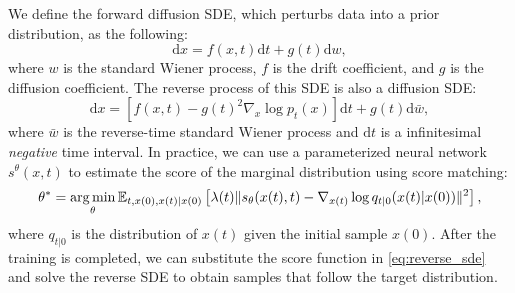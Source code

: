 We define the forward diffusion SDE, which perturbs data into a prior distribution, as the following:
\begin{equation}\label{eq:forward_sde}
    \mathrm d x = f(x, t)\mathrm d t + g(t)\mathrm dw,
\end{equation}
where $w$ is the standard Wiener process, $f$ is the drift coefficient, and $g$ is the diffusion coefficient. The reverse process of this SDE is also a diffusion SDE:
\begin{equation}\label{eq:reverse_sde}
    \mathrm d x = \left[f(x,t)-g(t)^2 \nabla_x \log p_t(x)\right]\mathrm dt + g(t)\mathrm d \bar{w},
\end{equation}
where $\bar{w}$ is the reverse-time standard Wiener process and $\mathrm dt$ is a infinitesimal \textit{negative} time interval. In practice, we can use a parameterized neural network $s^\theta(x, t)$ to estimate the score of the marginal distribution using score matching:
\begin{equation}
    \begin{aligned}
        \theta^*=\operatorname*{arg\,min}_{\theta}\mathbb{E}_{t, x(0),x(t)|x(0)}\left[\lambda(t)\|s_\theta(x(t), t)-\nabla_{x(t)}\log q_{t|0}(x(t)|x(0))\|^2\right],
    \end{aligned}
\end{equation}
where $q_{t|0}$ is the distribution of $x(t)$ given the initial sample $x(0)$. After the training is completed, we can substitute the score function in \eqref{eq:reverse_sde} and solve the reverse SDE to obtain samples that follow the target distribution. 

